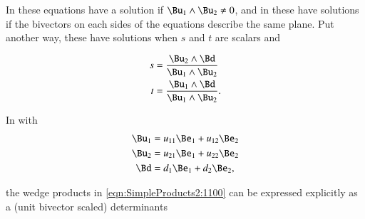 In  these equations have a solution if \( \Bu_1 \wedge \Bu_2 \ne 0 \), and in  these have solutions if the bivectors on each sides of the equations describe the same plane.
Put another way, these have solutions when \( s \) and \( t \) are scalars and

\begin{dmath}\label{eqn:SimpleProducts2:1100}
\begin{aligned}
s &= \frac{\Bu_2 \wedge \Bd}{\Bu_1 \wedge \Bu_2} \\
t &= \frac{\Bu_1 \wedge \Bd}{\Bu_1 \wedge \Bu_2}.
\end{aligned}
\end{dmath}

In
with
\begin{dmath}\label{eqn:solutionOfLinearSystem:1120}
\begin{aligned}
\Bu_1 &= u_{11} \Be_1 + u_{12} \Be_2 \\
\Bu_2 &= u_{21} \Be_1 + u_{22} \Be_2 \\
\Bd &= d_{1} \Be_1 + d_{2} \Be_2,
\end{aligned}
\end{dmath}

the wedge products in \cref{eqn:SimpleProducts2:1100}
can be expressed explicitly as a (unit bivector scaled) determinants

